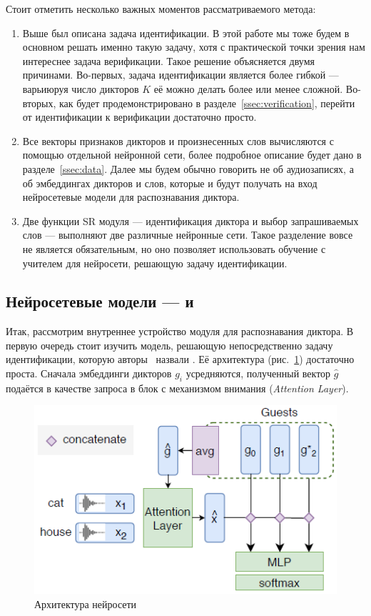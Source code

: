 Стоит отметить несколько важных моментов рассматриваемого метода:
\begin{enumerate}
    \item Выше был описана задача идентификации. В этой работе мы тоже будем
    в основном решать именно такую задачу, хотя с практической точки зрения нам
    интереснее задача верификации. Такое решение объясняется двумя причинами.
    Во-первых, задача идентификации является более гибкой --- варьиюруя число
    дикторов $K$ её можно делать более или менее сложной. Во-вторых, как будет
    продемонстрировано в разделе~\ref{ssec:verification}, перейти от
    идентификации к верификации достаточно просто.
    \item Все векторы признаков дикторов и произнесенных слов вычисляются с
    помощью отдельной нейронной сети, более подробное описание будет дано в
    разделе~\ref{ssec:data}. Далее мы будем обычно говорить не об
    аудиозаписях, а об эмбеддингах дикторов и слов, которые и будут получать
    на вход нейросетевые модели для распознавания диктора.
    \item Две функции SR модуля --- идентификация диктора и выбор запрашиваемых
    слов --- выполняют две различные нейронные сети. Такое разделение вовсе не
    является обязательным, но оно позволяет использовать обучение с учителем для
    нейросети, решающую задачу идентификации.
\end{enumerate}

\subsection{Нейросетевые модели --- \guesser{} и \enquirer{}}\label{ssec:nnet}

Итак, рассмотрим внутреннее устройство модуля для распознавания диктора. В
первую очередь стоит изучить модель, решающую непосредственно задачу
идентификации, которую авторы~\citeisr{} назвали \guesser{}. Её архитектура
(рис.~\ref{fig:guesser}) достаточно проста. Сначала эмбеддинги дикторов $g_i$
усредняются, полученный вектор $\hat{g}$ подаётся в качестве запроса в блок
с механизмом внимания (\textit{Attention Layer}).

\begin{figure}[hbt]
    \centering
    \includegraphics[scale=1.0]{figures/guesser.png}
    \caption{Архитектура нейросети \guesser{}~\citeisr}
    \label{fig:guesser}
\end{figure}

